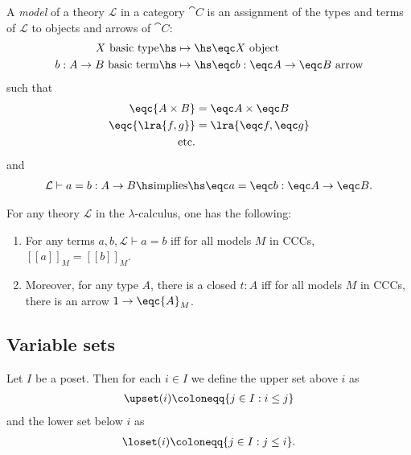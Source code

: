 \documentclass{article}
\begin{document}
\begin{definition}[Awodey p. 138]
    A \emph{model} of a theory $\mathcal{L}$ in a category $\cat C$
    is an assignment of the types and terms of $\mathcal{L}$ to objects
    and arrows of $\cat C$:
    \begin{align*}
        X\text{ basic type} \hs
        &\mapsto\hs\eqc X \text{ object} \\
        b:A\to B\text{ basic term} \hs
        &\mapsto\hs \eqc b: \eqc A \to \eqc B\text{ arrow}
    \end{align*}
    such that 
    \begin{align*}
        \eqc{A\times B} &= \eqc A \times \eqc B \\
        \eqc{\lra{f,g}} &= \lra{\eqc f, \eqc g}\\
        \text{etc.}
    \end{align*}
    and
    \begin{align*}
        \mathcal{L}\vdash a = b : A \to B \hs\text{implies}\hs
        \eqc a = \eqc b : \eqc A \to \eqc B.
    \end{align*}
\end{definition}

\begin{proposition}[Awodey p. 139]
    For any theory $\mathcal{L}$ in the $\lambda$-calculus, one has the
    following:
    \begin{enumerate}
        \item For any terms $a,b,\mathcal{L}\vdash a = b$ iff
            for all models $M$ in CCCs, $[\![a]\!]_M=[\![b]\!]_M$.
        \item Moreover, for any type $A$, there is a closed $t:A$ iff for all models $M$ in CCCs, there is an arrow $1\to\eqc{A}_M$. 
    \end{enumerate}
\end{proposition}

\subsection{Variable sets}

\begin{definition}
    Let $I$ be a poset. Then for each $i\in I$ we define 
    the upper set above $i$ as
    \begin{align*}
        \upset(i) \coloneqq \{j\in I : i\leq j\}
    \end{align*}
    and the lower set below $i$ as
    \begin{align*}
        \loset(i) \coloneqq \{j\in I : j\leq i\}.
    \end{align*}
\end{definition}
\end{document}
